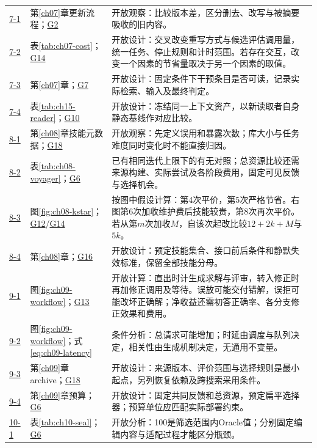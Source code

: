 \begin{small}
\begin{longtable}{@{}p{1.1cm}p{4.1cm}p{10.1cm}@{}}
\hyperref[ex:ch07-1]{7-1} & 第\ref{ch07}章更新流程；\hyperref[sol:g02]{G2} & 开放观察：比较版本差，区分删去、改写与被摘要吸收的旧内容。 \\
\hyperref[ex:ch07-2]{7-2} & 表\ref{tab:ch07-cost}；\hyperref[sol:g14]{G14} & 开放设计：交叉改变重写方式与候选评估调用量，统一任务、停止规则和计时范围。若存在交互，改变一个因素的节省量取决于另一个因素的取值。 \\
\hyperref[ex:ch07-3]{7-3} & 第\ref{ch07}章；\hyperref[sol:g07]{G7} & 开放设计：固定条件下干预条目是否可读，记录实际检索、输入及最终判定。 \\
\hyperref[ex:ch07-4]{7-4} & 表\ref{tab:ch15-reader}；\hyperref[sol:g10]{G10} & 开放设计：冻结同一上下文资产，以新读取者自身静态基线作对应比较。 \\
\hyperref[ex:ch08-1]{8-1} & 第\ref{ch08}章技能元数据；\hyperref[sol:g18]{G18} & 开放观察：先定义误用和暴露次数；库大小与任务难度同时变化时不能直接归因。 \\
\hyperref[ex:ch08-2]{8-2} & 表\ref{tab:ch08-voyager}；\hyperref[sol:g06]{G6} & 已有相同迭代上限下的有无对照；总资源比较还需来源构建、实际尝试及各阶段费用，固定可见反馈与选择机会。 \\
\hyperref[ex:ch08-3]{8-3} & 图\ref{fig:ch08-kstar}；\hyperref[sol:g12]{G12}/\hyperref[sol:g14]{G14} & 按图中假设计算：第4次平价，第5次严格节省。右图第6次加收维护费后技能较贵，第8次再次平价。若从第$m$次加收$M$，自该次起改比较$12+2k+M$与$5k$。 \\
\hyperref[ex:ch08-4]{8-4} & 第\ref{ch08}章；\hyperref[sol:g16]{G16} & 开放设计：预定技能集合、接口前后条件和静默失效标准，保留全部技能分母。 \\
\hyperref[ex:ch09-1]{9-1} & 图\ref{fig:ch09-workflow}；\hyperref[sol:g13]{G13} & 开放计算：直出时计生成求解与评审，转入修正时再加修正调用及等待。误放可能交付错解，误拒可能改坏正确解；净收益还需初答正确率、各分支修正效果和费用。 \\
\hyperref[ex:ch09-2]{9-2} & 图\ref{fig:ch09-workflow}；式\eqref{eq:ch09-latency} & 条件分析：总请求可能增加；时延由调度与队列决定，相关性由生成机制决定，无通用不变量。 \\
\hyperref[ex:ch09-3]{9-3} & 第\ref{ch09}章archive；\hyperref[sol:g18]{G18} & 开放设计：来源版本、评价范围与选择规则是最小起点，另列恢复依赖及跨搜索采用条件。 \\
\hyperref[ex:ch09-4]{9-4} & 第\ref{ch09}章预算；\hyperref[sol:g06]{G6} & 开放设计：固定共同反馈和总资源，预定扁平选择器；预算单位应匹配实际部署约束。 \\
\hyperref[ex:ch10-1]{10-1} & 表\ref{tab:ch10-seal}；\hyperref[sol:g06]{G6} & 开放分析：100是筛选范围内Oracle值；分别固定编辑内容与适配过程才能区分瓶颈。 \\

\end{longtable}
\end{small}
